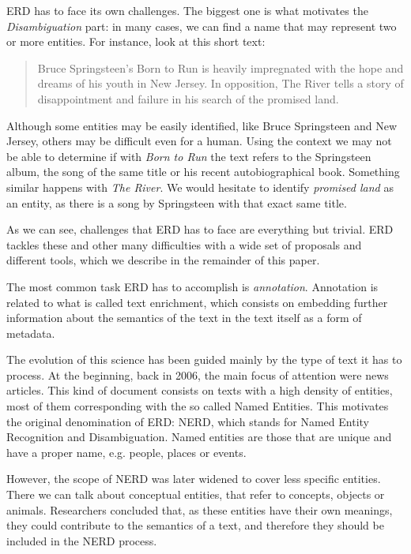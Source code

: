 ERD has to face its own challenges. The biggest one is what motivates the \emph{Disambiguation} part: in many cases, we can find a name that may represent two or more entities. For instance, look at this short text:

\begin{quotation}
Bruce Springsteen's Born to Run is heavily impregnated with the hope and dreams of his youth in New Jersey. In opposition, The River tells a story of disappointment and failure in his search of the promised land.
\end{quotation}

Although some entities may be easily identified, like Bruce Springsteen and New Jersey, others may be difficult even for a human. Using the context we may not be able to determine if with \emph{Born to Run} the text refers to the Springsteen album, the song of the same title or his recent autobiographical book. Something similar happens with \emph{The River}. We would hesitate to identify \emph{promised land} as an entity, as there is a song by Springsteen with that exact same title.

As we can see, challenges that ERD has to face are everything but trivial. ERD tackles these and other many difficulties with a wide set of proposals and different tools, which we describe in the remainder of this paper.

The most common task ERD has to accomplish is \emph{annotation}. Annotation is related to what is called text enrichment, which consists on embedding further information about the semantics of the text in the text itself as a form of metadata. 

The evolution of this science has been guided mainly by the type of text it has to process. At the beginning, back in 2006, the main focus of attention were news articles. This kind of document consists on texts with a high density of entities, most of them corresponding with the so called Named Entities. This motivates the original denomination of ERD: NERD, which stands for Named Entity Recognition and Disambiguation. Named entities are those that are unique and have a proper name, e.g. people, places or events.

However, the scope of NERD was later widened to cover less specific entities. There we can talk about conceptual entities, that refer to concepts, objects or animals. Researchers concluded that, as these entities have their own meanings, they could contribute to the semantics of a text, and therefore they should be included in the NERD process.

